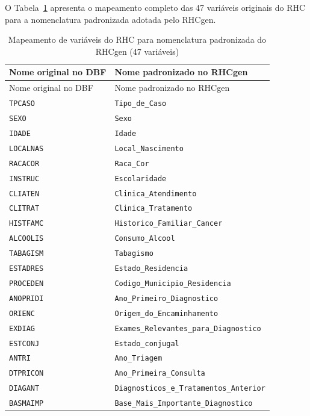 \documentclass[
  brazilian,
  a4paper,
  oneside]{scrbook}
\begin{document}
O Tabela~\ref{tbl-mapeamento} apresenta o mapeamento completo das 47
variáveis originais do RHC para a nomenclatura padronizada adotada pelo
RHCgen.

\begin{longtable}[]{@{}ll@{}}
\caption{Mapeamento de variáveis do RHC para nomenclatura padronizada do
RHCgen (47 variáveis)}\label{tbl-mapeamento}\tabularnewline
\toprule\noalign{}
Nome original no DBF & Nome padronizado no RHCgen \\
\midrule\noalign{}
\endfirsthead
\toprule\noalign{}
Nome original no DBF & Nome padronizado no RHCgen \\
\midrule\noalign{}
\endhead
\bottomrule\noalign{}
\endlastfoot
\texttt{TPCASO} & \texttt{Tipo\_de\_Caso} \\
\texttt{SEXO} & \texttt{Sexo} \\
\texttt{IDADE} & \texttt{Idade} \\
\texttt{LOCALNAS} & \texttt{Local\_Nascimento} \\
\texttt{RACACOR} & \texttt{Raca\_Cor} \\
\texttt{INSTRUC} & \texttt{Escolaridade} \\
\texttt{CLIATEN} & \texttt{Clinica\_Atendimento} \\
\texttt{CLITRAT} & \texttt{Clinica\_Tratamento} \\
\texttt{HISTFAMC} & \texttt{Historico\_Familiar\_Cancer} \\
\texttt{ALCOOLIS} & \texttt{Consumo\_Alcool} \\
\texttt{TABAGISM} & \texttt{Tabagismo} \\
\texttt{ESTADRES} & \texttt{Estado\_Residencia} \\
\texttt{PROCEDEN} & \texttt{Codigo\_Municipio\_Residencia} \\
\texttt{ANOPRIDI} & \texttt{Ano\_Primeiro\_Diagnostico} \\
\texttt{ORIENC} & \texttt{Origem\_do\_Encaminhamento} \\
\texttt{EXDIAG} & \texttt{Exames\_Relevantes\_para\_Diagnostico} \\
\texttt{ESTCONJ} & \texttt{Estado\_conjugal} \\
\texttt{ANTRI} & \texttt{Ano\_Triagem} \\
\texttt{DTPRICON} & \texttt{Ano\_Primeira\_Consulta} \\
\texttt{DIAGANT} & \texttt{Diagnosticos\_e\_Tratamentos\_Anterior} \\
\texttt{BASMAIMP} & \texttt{Base\_Mais\_Importante\_Diagnostico} \\

\end{longtable}
\end{document}
